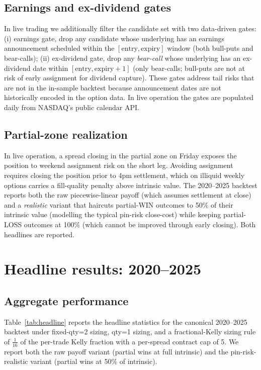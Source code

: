 \documentclass[11pt]{article}
\theoremstyle{definition}
\theoremstyle{remark}
\begin{document}
\subsection{Earnings and ex-dividend gates}
\label{sec:gates}

In live trading we additionally filter the candidate set with two
data-driven gates: (i) earnings gate, drop any candidate whose
underlying has an earnings announcement scheduled within the
$[\mathrm{entry}, \mathrm{expiry}]$ window (both bull-puts and
bear-calls); (ii) ex-dividend gate, drop any \emph{bear-call} whose
underlying has an ex-dividend date within
$[\mathrm{entry}, \mathrm{expiry} + 1]$ (only bear-calls; bull-puts
are not at risk of early assignment for dividend capture). These
gates address tail risks that are not in the in-sample backtest
because announcement dates are not historically encoded in the option
data. In live operation the gates are populated daily from NASDAQ's
public calendar API.

\subsection{Partial-zone realization}
\label{sec:partial-zone}

In live operation, a spread closing in the partial zone on Friday
exposes the position to weekend assignment risk on the short leg.
Avoiding assignment requires closing the position prior to 4pm
settlement, which on illiquid weekly options carries a fill-quality
penalty above intrinsic value. The 2020--2025 backtest reports both
the raw piecewise-linear payoff (which assumes settlement at close)
and a \emph{realistic} variant that haircuts partial-WIN outcomes to
50\% of their intrinsic value (modelling the typical pin-risk
close-cost) while keeping partial-LOSS outcomes at 100\% (which
cannot be improved through early closing). Both headlines are
reported.


\section{Headline results: 2020--2025}
\label{sec:results}

\subsection{Aggregate performance}

Table~\ref{tab:headline} reports the headline statistics for the
canonical 2020--2025 backtest under fixed-qty=2 sizing, qty=1 sizing,
and a fractional-Kelly sizing rule of $\tfrac{1}{16}$ of the per-trade
Kelly fraction with a per-spread contract cap of 5. We report both the
raw payoff variant (partial wins at full intrinsic) and the
pin-risk-realistic variant (partial wins at 50\% of intrinsic).
\end{document}
